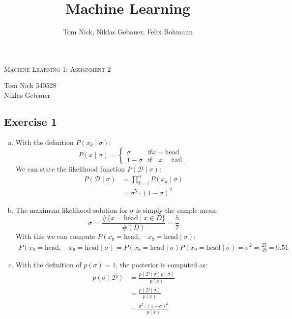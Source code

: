 \documentclass[10pt,a4paper]{article}
\author{Tom Nick, Niklas Gebauer, Felix Bohmann}
\title{Machine Learning}
\newcommand{\D}{\mathcal{D}}
\begin{document}
\begin{center}
\Large{\textsc{Machine Learning 1: Assignment 2}} \\
\end{center}

\begin{tabbing}
Tom Nick \hspace{0.9cm}\= 340528\\
Niklas Gebauer 
\end{tabbing}

\subsection*{Exercise 1}
\begin{enumerate}[(a)]
\item 
With the definition $P(x_k \mid \sigma)$:
$$P(x \mid \sigma) = \begin{cases} \sigma &\text{if} x = \text{head}\quad \\ 1 - \sigma &\text{if}\quad x = \text{tail} \end{cases}$$
We can state the likelihood function $P(\D \mid \sigma)$:
\begin{align*}
	P(\D \mid \sigma) &= \prod_{k = i}^{n} P(x_k \mid \sigma) \\
	&= \sigma^5 \cdot (1 - \sigma)^2
\end{align*}
\item
The maximum likelihood solution for $\sigma$ is simply the sample mean:
$$\sigma = \frac{\#\{ x = \text{head} \mid x \in D\}}{\#(D)} = \frac{5}{7}$$
With this we can compute $P(x_8 = \text{head} ,\quad x_9 = \text{head} \mid \sigma)$:
\begin{align*}
P(x_8 = \text{head} ,\quad x_9 = \text{head} \mid \sigma) = P(x_8 = \text{head} \mid \sigma)P(x_9 = \text{head} \mid \sigma) = \sigma^2 = \frac{25}{49} = 0.51
\end{align*}
\item
With the definition of $p(\sigma) = 1$, the posterior is computed as:
\begin{align*}
p(\sigma \mid \D) &= \frac{p(\D \mid \sigma)p(\sigma)}{p(x)} \\
&= \frac{p(\D \mid \sigma)}{p(x)} \\
&= \frac{\sigma^5 \cdot (1 - \sigma)^2}{p(x)}
\end{align*}

\end{enumerate}
\end{document}
